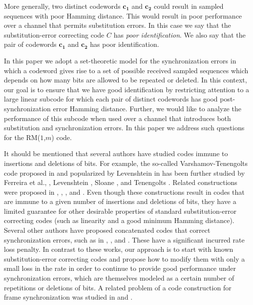 More generally, two distinct codewords
$\mathbf{c_1}$ and $\mathbf{c_2}$
could result in sampled sequences with poor
Hamming distance. This would result in poor
performance over a channel that permits
substitution errors. In this case we
say that the substitution-error
correcting code $C$ has
{\em poor identification}. We also say
that the pair of codewords
$\mathbf{c_1}$ and $\mathbf{c_2}$
has poor identification.

In this paper we adopt a set-theoretic model
for the synchronization errors in which a codeword
gives rise to a set of possible received sampled
sequences which depends on how many bits
are allowed to be repeated or deleted.
In this context, our goal is to
ensure that we have good identification
by restricting attention to a large linear subcode
for which each pair of distinct codewords has
good post-synchronization error Hamming distance.
Further, we would like to analyze the performance
of this subcode when used over a channel that
introduces both substitution and synchronization
errors.
In this paper we address such questions for the
RM($1$,$m$) code.

It should be mentioned that several authors have studied codes
immune to insertions and deletions of bits. For example, the
so-called Varshamov-Tenengolts code proposed in \cite{vt:65} and
popularized by Levenshtein in \cite {lev:66} has been further
studied by Ferreira et al., \cite {ferr:97}, Levenshtein
\cite{lev:92}, Sloane \cite{sloane:00}, and Tenengolts
\cite{ten:84}. Related constructions were proposed in
\cite{bours:94}, \cite{calabi:69}, \cite{clarke:93},
\cite{klove:95} and \cite{ullman:66}. Even though these
constructions result in codes that are immune to a given number of
insertions and deletions of bits, they have a limited guarantee
for other desirable properties of standard substitution-error
correcting codes (such as linearity and a good minimum Hamming
distance). Several other authors have proposed concatenated codes
that correct synchronization errors, such as in \cite{cmnv:03},
\cite{cf:03}, and \cite{dmackay:01}. These have a significant
incurred rate loss penalty. In contrast to these works, our
approach is to start with known substitution-error correcting
codes and propose how to modify them with only a small loss in the
rate in order to continue to provide good performance under
synchronization errors, which are themselves modeled as a certain
number of repetitions or deletions of bits. A related problem of a
code construction for frame synchronization was studied in
\cite{stiffler:65} and \cite{bose:67}.

